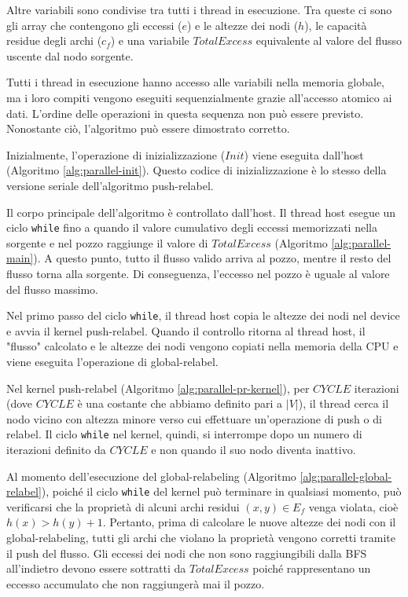         Altre variabili sono condivise tra tutti i thread in esecuzione. Tra queste ci sono gli array che contengono gli eccessi ($e$) e le altezze dei nodi ($h$), le capacità residue degli archi ($c_f$) e una variabile $TotalExcess$ equivalente al valore del flusso uscente dal nodo sorgente.

        Tutti i thread in esecuzione hanno accesso alle variabili nella memoria globale, ma i loro compiti vengono eseguiti sequenzialmente grazie all'accesso atomico ai dati. L'ordine delle operazioni in questa sequenza non può essere previsto. Nonostante ciò, l'algoritmo può essere dimostrato corretto.

        Inizialmente, l'operazione di inizializzazione ($Init$) viene eseguita dall'host (Algoritmo \ref{alg:parallel-init}). Questo codice di inizializzazione è lo stesso della versione seriale dell'algoritmo push-relabel.
        
        Il corpo principale dell'algoritmo è controllato dall'host. Il thread host esegue un ciclo \verb|while| fino a quando il valore cumulativo degli eccessi memorizzati nella sorgente e nel pozzo raggiunge il valore di $TotalExcess$ (Algoritmo \ref{alg:parallel-main}). A questo punto, tutto il flusso valido arriva al pozzo, mentre il resto del flusso torna alla sorgente. Di conseguenza, l'eccesso nel pozzo è uguale al valore del flusso massimo.

        Nel primo passo del ciclo \verb|while|, il thread host copia le altezze dei nodi nel device e avvia il kernel push-relabel. Quando il controllo ritorna al thread host, il "flusso" calcolato e le altezze dei nodi vengono copiati nella memoria della CPU e viene eseguita l'operazione di global-relabel. 
        
        Nel kernel push-relabel (Algoritmo \ref{alg:parallel-pr-kernel}), per $CYCLE$ iterazioni (dove $CYCLE$ è una costante che abbiamo definito pari a $|V|$), il thread cerca il nodo vicino con altezza minore verso cui effettuare un'operazione di push o di relabel. 
        Il ciclo \verb|while| nel kernel, quindi, si interrompe dopo un numero di iterazioni definito da $CYCLE$ e non quando il suo nodo diventa inattivo.  

        Al momento dell'esecuzione del global-relabeling (Algoritmo \ref{alg:parallel-global-relabel}), poiché il ciclo \verb|while| del kernel può terminare in qualsiasi momento, può verificarsi che la proprietà di alcuni archi residui $(x, y) \in E_f$ venga violata, cioè $h(x) > h(y) + 1$. Pertanto, prima di calcolare le nuove altezze dei nodi con il global-relabeling, tutti gli archi che violano la proprietà vengono corretti tramite il push del flusso. Gli eccessi dei nodi che non sono raggiungibili dalla BFS all'indietro devono essere sottratti da $TotalExcess$ poiché rappresentano un eccesso accumulato che non raggiungerà mai il pozzo.

